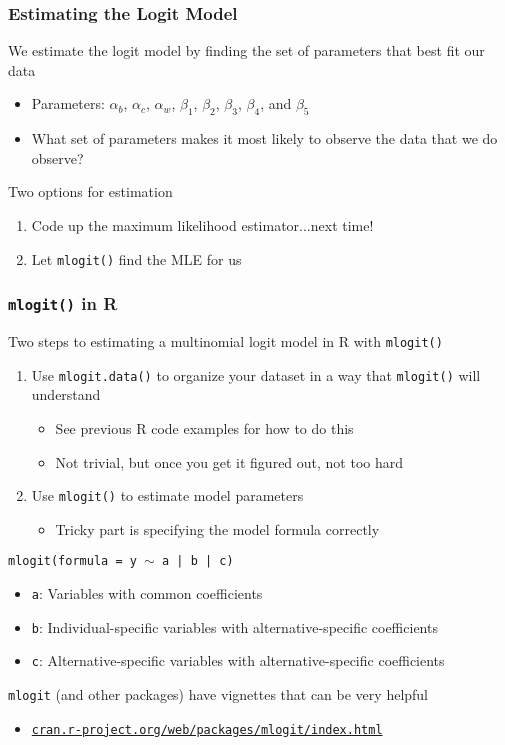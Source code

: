 \documentclass{beamer}
\begin{document}
\begin{frame}\frametitle{Estimating the Logit Model}
    We estimate the logit model by finding the set of parameters that best fit our data
    \begin{itemize}
    	\item Parameters: $\alpha_b$, $\alpha_c$, $\alpha_w$, $\beta_1$, $\beta_2$, $\beta_3$, $\beta_4$, and $\beta_5$
    	\item What set of parameters makes it most likely to observe the data that we do observe?
    \end{itemize}
    \vspace{3ex}
    Two options for estimation
    \begin{enumerate}
    	\item Code up the maximum likelihood estimator...next time!
    	\item Let \texttt{mlogit()} find the MLE for us
    \end{enumerate}
\end{frame}

\begin{frame}\frametitle{\texttt{mlogit()} in R}
    Two steps to estimating a multinomial logit model in R with \texttt{mlogit()}
    \begin{enumerate}
    	\item Use \texttt{mlogit.data()} to organize your dataset in a way that \texttt{mlogit()} will understand
    	\begin{itemize}
    		\item See previous R code examples for how to do this
    		\item Not trivial, but once you get it figured out, not too hard
    	\end{itemize}
    	\item Use \texttt{mlogit()} to estimate model parameters
    	\begin{itemize}
    		\item Tricky part is specifying the model formula correctly
    	\end{itemize}
    \end{enumerate}
    \vspace{2ex}
    \texttt{mlogit(formula = y $\sim$ a | b | c)}
    \begin{itemize}
    	\item \texttt{a}: Variables with common coefficients
    	\item \texttt{b}: Individual-specific variables with alternative-specific coefficients
    	\item \texttt{c}: Alternative-specific variables with alternative-specific coefficients
    \end{itemize}
    \vspace{2ex}
    \texttt{mlogit} (and other packages) have vignettes that can be very helpful
    \begin{itemize}
    	\item \href{https://cran.r-project.org/web/packages/mlogit/index.html}{\texttt{cran.r-project.org/web/packages/mlogit/index.html}}
    \end{itemize}
\end{frame}
\end{document}
